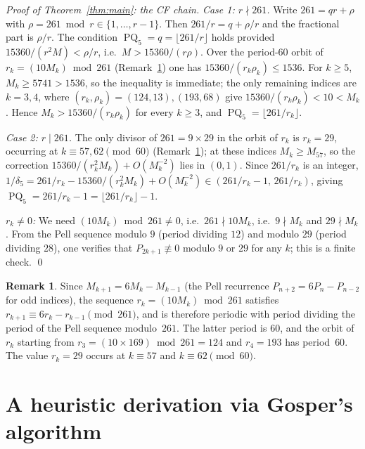 \documentclass[12pt]{amsart}
\theoremstyle{definition}
\newtheorem{remark}[theorem]{Remark}
\newcommand{\floor}[1]{\lfloor #1 \rfloor}
\DeclareMathOperator{\PQ}{PQ}
\begin{document}
\begin{proof}[Proof of Theorem~\ref{thm:main}: the CF chain]
  \emph{Case 1: $r \nmid 261$.}  Write $261 = qr + \rho$ with
  $\rho = 261 \bmod r \in \{1,\ldots,r-1\}$.  Then $261/r = q + \rho/r$
  and the fractional part is $\rho/r$.  The condition
  $\PQ_5 = q = \floor{261/r}$ holds provided $15360/(r^2 M) < \rho/r$,
  i.e.\ $M > 15360/(r\rho)$.  Over the period-$60$ orbit of
  $r_k = (10M_k) \bmod 261$ (Remark~\ref{rem:rk-orbit}) one has
  $15360/(r_k \rho_k) \le 1536$.  For $k \ge 5$, $M_k \ge 5741 > 1536$, so the
  inequality is immediate; the only remaining indices are $k = 3, 4$, where
  $(r_k,\rho_k) = (124,13), (193,68)$ give $15360/(r_k\rho_k) < 10 < M_k$.
  Hence $M_k > 15360/(r_k\rho_k)$ for every $k \ge 3$, and
  $\PQ_5 = \floor{261/r_k}$.

  \emph{Case 2: $r \mid 261$.}  The only divisor of $261 = 9 \times 29$ in the
  orbit of $r_k$ is $r_k = 29$, occurring at $k \equiv 57, 62 \pmod{60}$
  (Remark~\ref{rem:rk-orbit}); at these indices $M_k \ge M_{57}$, so the
  correction $15360/(r_k^2 M_k) + O(M_k^{-2})$ lies in $(0,1)$.  Since $261/r_k$
  is an integer, $1/\delta_5 = 261/r_k - 15360/(r_k^2 M_k) + O(M_k^{-2}) \in
  (261/r_k - 1,\, 261/r_k)$, giving $\PQ_5 = 261/r_k - 1 = \floor{261/r_k} - 1$.

  \emph{$r_k \neq 0$:}  We need $(10M_k) \bmod 261 \neq 0$,
  i.e.\ $261 \nmid 10M_k$, i.e.\ $9 \nmid M_k$ and $29 \nmid M_k$.
  From the Pell sequence modulo $9$ (period dividing $12$) and modulo
  $29$ (period dividing $28$), one verifies that $P_{2k+1} \not\equiv 0$
  modulo $9$ or $29$ for any $k$; this is a finite check.
  \qed
\end{proof}

\begin{remark}\label{rem:rk-orbit}
  Since $M_{k+1} = 6M_k - M_{k-1}$ (the Pell recurrence $P_{n+2} =
  6P_n - P_{n-2}$ for odd indices), the sequence $r_k = (10M_k) \bmod 261$
  satisfies $r_{k+1} \equiv 6r_k - r_{k-1} \pmod{261}$, and is therefore
  periodic with period dividing the period of the Pell sequence modulo~$261$.
  The latter period is $60$, and the orbit of $r_k$ starting from
  $r_3 = (10 \times 169) \bmod 261 = 124$ and $r_4 = 193$ has period~$60$.
  The value $r_k = 29$ occurs at $k \equiv 57$ and $k \equiv 62 \pmod{60}$.
\end{remark}

\section{A heuristic derivation via Gosper's algorithm}
\label{sec:gosper}
\end{document}
